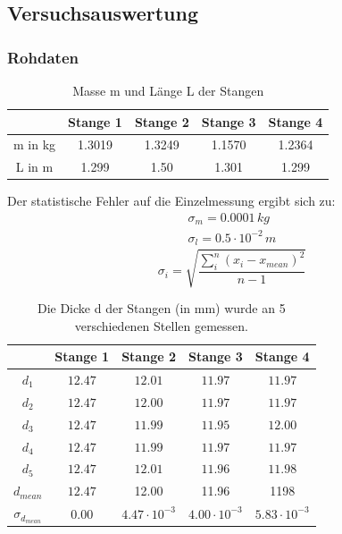\documentclass[12pt,a4paper]{article}
\begin{document}
\subsection{Versuchsauswertung}

\subsubsection{Rohdaten}

\begin{table}[H]\centering
\caption{Masse m und Länge L der Stangen}
\begin{tabular}{c|cccc}
& Stange 1 & Stange 2 & Stange 3 & Stange 4 \\ 
\hline
m in kg & 1.3019 & 1.3249 & 1.1570 & 1.2364 \\ 
L in m & 1.299  & 1.50 & 1.301 & 1.299 \\ 
\end{tabular} 
\end{table}
Der statistische Fehler auf die Einzelmessung ergibt sich zu:
\begin{align*}
\sigma_m=0.0001\,kg\\
\sigma_l=0.5\cdot10^{-2}\,m
\end{align*}
\begin{equation}
\sigma_i=\sqrt{\frac{\sum_i^n(x_i-x_{mean})^2}{n-1}}
\end{equation}
\begin{table}[H]\centering
\caption{Die Dicke d der Stangen (in mm) wurde an 5 verschiedenen Stellen gemessen.}

\begin{tabular}{c|cccc}
 & Stange 1 & Stange 2 & Stange 3 & Stange 4 \\ 
 \hline
$d_1$ & $12.47$ & $12.01$ & $11.97$ & $11.97$ \\ 
$d_2$ & $12.47$ & $12.00$ & $11.97$ & $11.97$ \\ 
$d_3$ & $12.47$ & $11.99$ & $11.95$ & $12.00$ \\ 
$d_4$ & $12.47$ & $11.99$ & $11.97$ & $11.97$ \\ 
$d_5$ & $12.47$ & $12.01$ & $11.96$ & $11.98$ \\ 
\hline
$d_{mean}$ & $12.47$ & 12.00 & 11.96 & 1198 \\ 
$\sigma_{d_{mean}}$ & $0.00$ & $4.47\cdot 10^{-3}$ & $4.00\cdot 10^{-3}$ & $5.83\cdot 10^{-3}$ \\ 
\end{tabular} 
\end{table}
\end{document}
